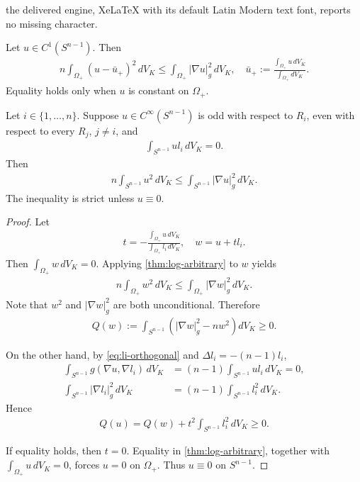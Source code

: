 \documentclass[10pt,a4paper]{amsart}
\newcommand{\Sn}{S^{n-1}}
\newcommand{\eq}[1]{\begin{equation}\begin{alignedat}{2}#1\end{alignedat}\end{equation}}
\begin{document}
the delivered engine, XeLaTeX with its default Latin Modern text font, reports no missing character.
\begin{theorem}\label{thm:log-arbitrary}
Let $u\in C^1(\Sn)$. Then \eq{\label{eq:log-arbitrary}
 n\int_{\Omega_+}(u-\bar{u}_+)^2\,dV_K
 \leq \int_{\Omega_+}|\nabla u|_g^2\,dV_K,
 \quad
\bar{u}_+:=\frac{\int_{\Omega_+}u\,dV_K}
 {\int_{\Omega_+}dV_K}.
}
Equality holds only when $u$ is constant on $\Omega_+$.
\end{theorem}

\begin{corollary}\label{cor:one-odd-orthogonal}
Let $i\in\{1,\ldots,n\}$. Suppose $u\in C^{\infty}(\Sn)$ is odd with respect to $R_i$, even with respect to every $R_j$, $j\ne i$, and
\eq{\label{eq:li-orthogonal}
 \int_{\Sn}ul_i\,dV_K=0.
}
Then
\eq{
 n\int_{\Sn}u^2\,dV_K
 \leq\int_{\Sn}|\nabla u|_g^2\,dV_K.
}
The inequality is strict unless $u\equiv 0$.
\end{corollary}

\begin{proof}
Let
\eq{
 t=-\frac{\int_{\Omega_+}u\,dV_K}{\int_{\Omega_+}l_i\,dV_K},\quad w=u+tl_i.
}
Then $\int_{\Omega_+}w\,dV_K=0$. Applying \autoref{thm:log-arbitrary} to $w$ yields
\eq{
 n\int_{\Omega_+}w^2\,dV_K
 \leq\int_{\Omega_+}|\nabla w|_g^2\,dV_K.
}
Note that $w^2$ and $|\nabla w|_g^2$ are both unconditional. Therefore
\eq{
 Q(w):=\int_{\Sn}\left(|\nabla w|_g^2-nw^2\right)dV_K\geq 0.
}

On the other hand, by \eqref{eq:li-orthogonal} and $\Delta l_i=-(n-1)l_i$,
\eq{
 \int_{\Sn}g(\nabla u,\nabla l_i)\,dV_K&=(n-1)\int_{\Sn}ul_i\,dV_K=0,\\
 \int_{\Sn}|\nabla l_i|_g^2\,dV_K&=(n-1)\int_{\Sn}l_i^2\,dV_K.
}
Hence
\eq{
 Q(u)=Q(w)+t^2\int_{\Sn}l_i^2\,dV_K\geq 0.
}

If equality holds, then $t=0$. Equality in \autoref{thm:log-arbitrary}, together with $\int_{\Omega_+}u\,dV_K=0$, forces $u=0$ on $\Omega_+$. Thus $u\equiv 0$ on $\Sn$.
\end{proof}
\end{document}
